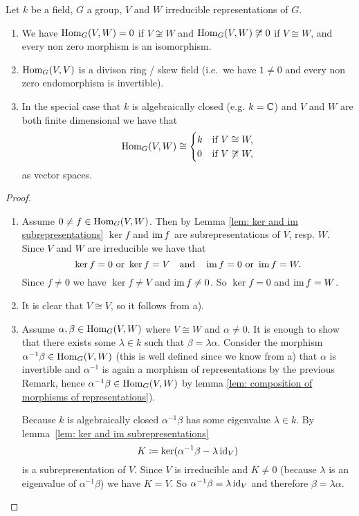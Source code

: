 \begin{lem}
 Let $k$ be a field, $G$ a group, $V$ and $W$ irreducible representations of $G$.
 \begin{enumerate}[label=\emph{\alph*)},leftmargin=*]
  \item
   We have $\operatorname{Hom}_G(V,W) = 0$ if $V \not\cong W$ and $\operatorname{Hom}_G(V,W) \not\cong 0$ if $V \cong W$, and every non zero morphism is an isomorphism.
  \item
   $\operatorname{Hom}_G(V,V)$ is a divison ring / skew field (i.e.\ we have $1 \neq 0$ and every non zero endomorphism is invertible).
  \item
   In the special case that $k$ is algebraically closed (e.g. $k = \mathbb{C}$) and $V$ and $W$ are both finite dimensional we have that
   \[
    \operatorname{Hom}_G(V,W) \cong
    \begin{cases}
     k & \text{if } V \cong W, \\
     0 & \text{if } V \not\cong W,
    \end{cases}
   \]
   as vector spaces.
 \end{enumerate}
\end{lem}
\begin{proof}
 \begin{enumerate}[label=\emph{\alph*)},leftmargin=*]
  \item 
   Assume $0 \neq f \in \operatorname{Hom}_G(V,W)$. Then by Lemma \ref{lem: ker and im subrepresentations} $\ker f$ and $\operatorname{im} f$ are subrepresentations of $V$, resp. $W$. Since $V$ and $W$ are irreducible we have that
   \[
    \ker f = 0 \text{ or } \ker f = V \quad \text{and} \quad \operatorname{im} f = 0 \text{ or } \operatorname{im} f = W.
   \]
   Since $f \neq 0$ we have $\ker f \neq V$ and $\operatorname{im} f \neq 0$. So $\ker f = 0$ and $\operatorname{im} f = W$.
  \item
   It is clear that $V \cong V$, so it follows from a).
  \item
   Assume $\alpha, \beta \in \operatorname{Hom}_G(V,W)$ where $V \cong W$ and $\alpha \neq 0$. It is enough to show that there exists some $\lambda \in k$ such that $\beta = \lambda \alpha$. Consider the morphism $\alpha^{-1} \beta \in \operatorname{Hom}_G(V,W)$ (this is well defined since we know from a) that $\alpha$ is invertible and $\alpha^{-1}$ is again a morphism of representations by the previous Remark, hence $\alpha^{-1} \beta \in \operatorname{Hom}_G(V,W)$ by lemma \ref{lem: composition of morphisms of representations}).
   
   Because $k$ is algebraically closed $\alpha^{-1} \beta$ has some eigenvalue $\lambda \in k$. By \mbox{lemma \ref{lem: ker and im subrepresentations}}
   \[
    K \coloneqq \ker(\alpha^{-1} \beta - \lambda \operatorname{id}_V)
   \]
   is a subrepresentation of $V$. Since $V$ is irreducible and $K \neq 0$ (because $\lambda$ is an eigenvalue of $\alpha^{-1} \beta$) we have $K = V$. So $\alpha^{-1} \beta = \lambda \operatorname{id}_V$ and therefore $\beta = \lambda \alpha$.
  \qedhere
 \end{enumerate}
\end{proof}


